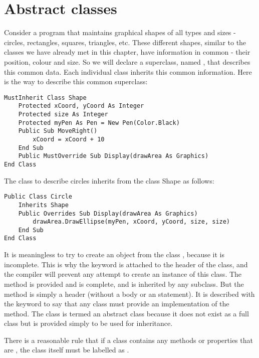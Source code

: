 	\section{Abstract classes}
		Consider a program that maintains graphical shapes of all types and sizes - circles, rectangles, squares, triangles, etc. These different shapes, similar to the classes we have already met in this chapter, have information in common - their position, colour and size. So we will declare a superclass, named , that describes this common data. Each individual class inherits this common information. Here is the way to describe this common superclass:
		\begin{lstlisting}
MustInherit Class Shape
	Protected xCoord, yCoord As Integer
	Protected size As Integer
	Protected myPen As Pen = New Pen(Color.Black)
	Public Sub MoveRight()
		xCoord = xCoord + 10
	End Sub
	Public MustOverride Sub Display(drawArea As Graphics)
End Class
		\end{lstlisting}
The class to describe circles inherits from the class Shape as follows:
		\begin{lstlisting}
Public Class Circle
	Inherits Shape
	Public Overrides Sub Display(drawArea As Graphics)
		drawArea.DrawEllipse(myPen, xCoord, yCoord, size, size)
	End Sub
End Class
		\end{lstlisting}
		It is meaningless to try to create an object from the class , because it is incomplete. This is why the keyword  is attached to the header of the class, and the compiler will prevent any attempt to create an instance of this class. The method  is provided and is complete, and is inherited by any subclass. But the method  is simply a header (without a body or an  statement). It is described with the keyword  to say that any class must provide an implementation of the method. The class  is termed an abstract class because it does not exist as a full class but is provided simply to be used for inheritance.
		
		There is a reasonable rule that if a class contains any methods or properties that are , the class itself must be labelled as .
		
